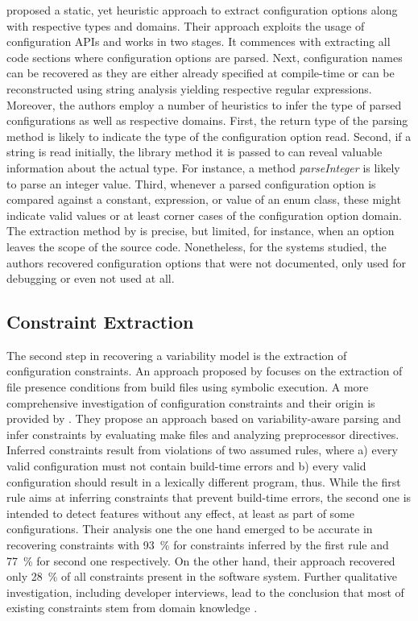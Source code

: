 \cite{rabkin_static_2011} proposed a static, yet heuristic approach to extract
configuration options along with respective types and domains. Their approach
exploits the usage of configuration APIs and works
in two stages. It commences with extracting all code sections where
configuration options are parsed. Next, configuration names can be
recovered as they are either already specified at compile-time or can be
reconstructed using string analysis yielding respective regular expressions.
Moreover, the authors employ a number of heuristics to infer the type of parsed
configurations as well as respective domains. First, the return type of the
parsing method is likely to indicate the type of the configuration option read.
Second, if a string is read initially, the library method it is passed to can
reveal valuable information about the actual type. For instance, a method
\emph{parseInteger} is likely to parse an integer value. Third, whenever a
parsed configuration option is compared against a constant, expression, or value
of an enum class, these might indicate valid values or at least corner cases of
the configuration option domain. The extraction method by
\cite{rabkin_static_2011} is precise, but limited, for instance, when an
option leaves the scope of the source code.
Nonetheless, for the systems studied, the authors recovered configuration
options that were not documented, only used for debugging or even not used at
all.

\subsection{Constraint Extraction}
The second step in recovering a variability model is the
extraction of configuration constraints. An approach proposed by \cite{zhou_extracting_2015}
focuses on the extraction of file presence conditions from build files using symbolic execution. A more comprehensive investigation of configuration
constraints and their origin is provided by \cite{nadi_mining_2014,nadi_where_2015}. They
propose an approach based on variability-aware parsing and infer constraints by
evaluating make files and  analyzing preprocessor directives. Inferred
constraints result from violations of two assumed rules, where a) every valid
configuration must not contain build-time errors and b) every valid
configuration should result in a lexically different program, thus. While the
first rule aims at inferring constraints that prevent build-time errors, the
second one is intended to detect features without any effect, at least as part
of some configurations. Their analysis one the one hand emerged to be accurate
in recovering constraints with 93~\% for constraints inferred by the first rule
and 77~\% for second one respectively. On the other hand, their approach
recovered only 28~\% of all constraints present in the software system.
Further qualitative investigation, including developer interviews, lead to
the conclusion that most of existing constraints stem from domain knowledge
\citep{nadi_where_2015}.

